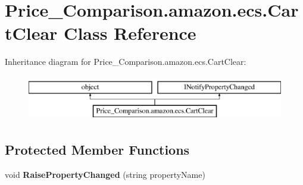 \hypertarget{class_price___comparison_1_1amazon_1_1ecs_1_1_cart_clear}{\section{Price\-\_\-\-Comparison.\-amazon.\-ecs.\-Cart\-Clear Class Reference}
\label{class_price___comparison_1_1amazon_1_1ecs_1_1_cart_clear}
}


 


Inheritance diagram for Price\-\_\-\-Comparison.\-amazon.\-ecs.\-Cart\-Clear\-:\begin{figure}[H]
\begin{center}
\leavevmode
\includegraphics[height=2.000000cm]{class_price___comparison_1_1amazon_1_1ecs_1_1_cart_clear}
\end{center}
\end{figure}
\subsection*{Protected Member Functions}
\begin{DoxyCompactItemize}
\item 
\hypertarget{class_price___comparison_1_1amazon_1_1ecs_1_1_cart_clear_ae89a05600a2a31a5c94b4b42f782fb60}{void {\bfseries Raise\-Property\-Changed} (string property\-Name)}\label{class_price___comparison_1_1amazon_1_1ecs_1_1_cart_clear_ae89a05600a2a31a5c94b4b42f782fb60}

\end{DoxyCompactItemize}
